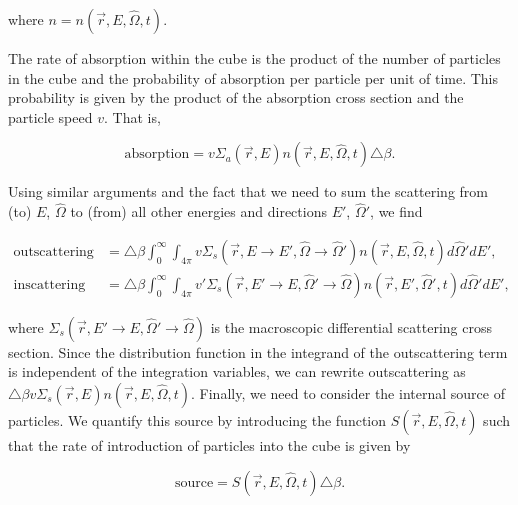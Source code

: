 \documentclass[12pt]{article}
\newcommand{\rvec}{\ensuremath{\vec{r}}}
\newcommand{\omvec}{\ensuremath{\hat{\Omega}}}
\begin{document}
where $n = n(\rvec,E,\omvec,t)$.

The rate of absorption within the cube is the product of the number of
particles in the cube and the probability of absorption per particle per unit
of time. This probability is given by the product of the absorption cross
section and the particle speed $v$. That is,

\begin{equation*}
\textrm{absorption} = v\Sigma_a(\rvec,E)n(\rvec ,E,\omvec,t)\triangle \beta.
\end{equation*}

Using similar arguments and the fact that we need to sum the scattering from
(to) $E$, $\omvec$ to (from) all other energies and directions $E'$, $\omvec'$,
we find

\begin{align*}
\textrm{outscattering} &=
\triangle \beta \int_0^{\infty}\int_{4\pi}
v\Sigma_s(\rvec,E\rightarrow E', \omvec\rightarrow\omvec')
n(\rvec,E,\omvec,t)d\omvec'dE', \\
\textrm{inscattering} &= \triangle \beta \int_0^{\infty}\int_{4\pi}
v'\Sigma_s(\rvec,E'\rightarrow E, \omvec'\rightarrow\omvec)
n(\rvec,E',\omvec',t)d\omvec'dE',
\end{align*}

where $\Sigma_s(\rvec,E'\rightarrow E, \omvec'\rightarrow\omvec)$ is the
macroscopic differential scattering cross section. Since the distribution
function in the integrand of the outscattering term is independent of the
integration variables, we can rewrite outscattering as 
$\triangle \beta v\Sigma_s(\rvec,E)n(\rvec, E, \omvec,t)$.
Finally, we need to consider the internal source of particles. We quantify this
source by introducing the function $S(\rvec, E, \omvec, t)$ such that the rate
of introduction of particles into the cube is given by

\begin{equation*}
\textrm{source} = S(\rvec,E,\omvec,t)\triangle \beta.
\end{equation*}
\end{document}

